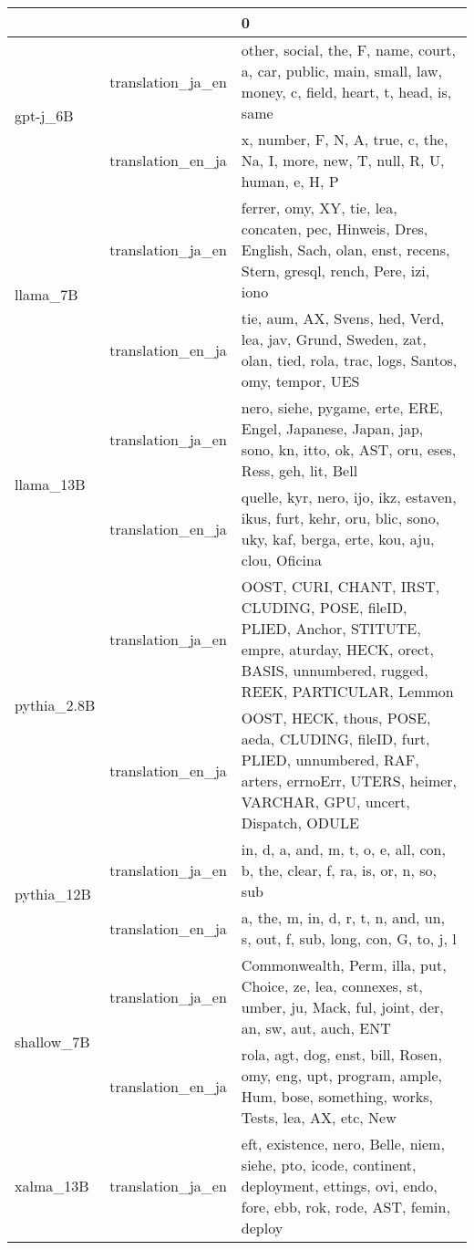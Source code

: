 \begin{tabular}{lll}
\toprule
 &  & 0 \\
\midrule
\multirow[t]{2}{*}{gpt-j_6B} & translation_ja_en & other, social, the, F, name, court, a, car, public, main, small, law, money, c, field, heart, t, head, is, same \\
 & translation_en_ja & x, number, F, N, A, true, c, the, Na, I, more, new, T, null, R, U, human, e, H, P \\
\cline{1-3}
\multirow[t]{2}{*}{llama_7B} & translation_ja_en & ferrer, omy, XY, tie, lea, concaten, pec, Hinweis, Dres, English, Sach, olan, enst, recens, Stern, gresql, rench, Pere, izi, iono \\
 & translation_en_ja & tie, aum, AX, Svens, hed, Verd, lea, jav, Grund, Sweden, zat, olan, tied, rola, trac, logs, Santos, omy, tempor, UES \\
\cline{1-3}
\multirow[t]{2}{*}{llama_13B} & translation_ja_en & nero, siehe, pygame, erte, ERE, Engel, Japanese, Japan, jap, sono, kn, itto, ok, AST, oru, eses, Ress, geh, lit, Bell \\
 & translation_en_ja & quelle, kyr, nero, ijo, ikz, estaven, ikus, furt, kehr, oru, blic, sono, uky, kaf, berga, erte, kou, aju, clou, Oficina \\
\cline{1-3}
\multirow[t]{2}{*}{pythia_2.8B} & translation_ja_en & OOST, CURI, CHANT, IRST, CLUDING, POSE, fileID, PLIED, Anchor, STITUTE, empre, aturday, HECK, orect, BASIS, unnumbered, rugged, REEK, PARTICULAR, Lemmon \\
 & translation_en_ja & OOST, HECK, thous, POSE, aeda, CLUDING, fileID, furt, PLIED, unnumbered, RAF, arters, errnoErr, UTERS, heimer, VARCHAR, GPU, uncert, Dispatch, ODULE \\
\cline{1-3}
\multirow[t]{2}{*}{pythia_12B} & translation_ja_en & in, d, a, and, m, t, o, e, all, con, b, the, clear, f, ra, is, or, n, so, sub \\
 & translation_en_ja & a, the, m, in, d, r, t, n, and, un, s, out, f, sub, long, con, G, to, j, l \\
\cline{1-3}
\multirow[t]{2}{*}{shallow_7B} & translation_ja_en & Commonwealth, Perm, illa, put, Choice, ze, lea, connexes, st, umber, ju, Mack, ful, joint, der, an, sw, aut, auch, ENT \\
 & translation_en_ja & rola, agt, dog, enst, bill, Rosen, omy, eng, upt, program, ample, Hum, bose, something, works, Tests, lea, AX, etc, New \\
\cline{1-3}
\multirow[t]{2}{*}{xalma_13B} & translation_ja_en & eft, existence, nero, Belle, niem, siehe, pto, icode, continent, deployment, ettings, ovi, endo, fore, ebb, rok, rode, AST, femin, deploy \\

\end{tabular}
